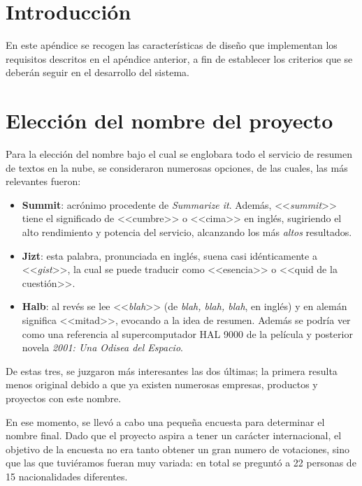 
\section{Introducción}

En este apéndice se recogen las características de diseño que implementan los requisitos descritos en el apéndice anterior, a fin de establecer los criterios que se deberán seguir en el desarrollo del sistema.

\section{Elección del nombre del proyecto}

Para la elección del nombre bajo el cual se englobara todo el servicio de resumen de textos en la nube, se consideraron numerosas opciones, de las cuales, las más relevantes fueron:

\vspace{-0.2cm}
\begin{itemize} [\textbullet]
	\item \textbf{Summit}: acrónimo procedente de \emph{Summarize it}. Además, <<\emph{summit}>> tiene el significado de <<cumbre>> o <<cima>> en inglés, sugiriendo el alto rendimiento y potencia del servicio, alcanzando los más \emph{altos} resultados.
	
	\item \textbf{Jizt}: esta palabra, pronunciada en inglés, suena casi idénticamente a <<\emph{gist}>>, la cual se puede traducir como <<esencia>> o <<quid de la cuestión>>.
	
	\item \textbf{Halb}: al revés se lee <<\emph{blah}>> (de \emph{blah, blah, blah}, en inglés) y en alemán significa <<mitad>>, evocando a la idea de resumen. Además se podría ver como una referencia al supercomputador HAL 9000 de la película y posterior novela \emph{2001: Una Odisea del Espacio}.
\end{itemize}

De estas tres, se juzgaron más interesantes las dos últimas; la primera resulta menos original debido a que ya existen numerosas empresas, productos y proyectos con este nombre.

En ese momento, se llevó a cabo una pequeña encuesta para determinar el nombre final. Dado que el proyecto aspira a tener un carácter internacional, el objetivo de la encuesta no era tanto obtener un gran numero de votaciones, sino que las que tuviéramos fueran muy variada: en total se preguntó a 22 personas de 15 nacionalidades diferentes.

